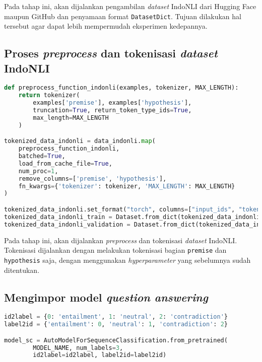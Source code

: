 Pada tahap ini, akan dijalankan pengambilan \emph{dataset} IndoNLI dari Hugging Face maupun GitHub dan penyamaan format \texttt{DatasetDict}. Tujuan dilakukan hal tersebut agar dapat lebih mempermudah eksperimen kedepannya.

\subsection{Proses \emph{preprocess} dan tokenisasi \emph{dataset} IndoNLI}
\begin{lstlisting}[language=Python, caption=Proses \emph{preprocess} dan tokenisasi \emph{dataset} IndoNLI]
def preprocess_function_indonli(examples, tokenizer, MAX_LENGTH):
    return tokenizer(
        examples['premise'], examples['hypothesis'],
        truncation=True, return_token_type_ids=True,
        max_length=MAX_LENGTH
    )

tokenized_data_indonli = data_indonli.map(
    preprocess_function_indonli,
    batched=True,
    load_from_cache_file=True,
    num_proc=1,
    remove_columns=['premise', 'hypothesis'],
    fn_kwargs={'tokenizer': tokenizer, 'MAX_LENGTH': MAX_LENGTH}
)

tokenized_data_indonli.set_format("torch", columns=["input_ids", "token_type_ids"], output_all_columns=True, device=device)
tokenized_data_indonli_train = Dataset.from_dict(tokenized_data_indonli["train"][:SAMPLE])
tokenized_data_indonli_validation = Dataset.from_dict(tokenized_data_indonli["validation"][:SAMPLE])
\end{lstlisting}

Pada tahap ini, akan dijalankan  \emph{preprocess} dan tokenisasi \emph{dataset} IndoNLI. Tokenisasi dijalankan dengan melakukan tokenisasi bagian \texttt{premise} dan \texttt{hypothesis} saja, dengan menggunakan \emph{hyperparameter} yang sebelumnya sudah ditentukan.

\subsection{Mengimpor model \emph{question answering}}
\begin{lstlisting}[language=Python, caption=Mengimpor model \emph{question answering}]
id2label = {0: 'entailment', 1: 'neutral', 2: 'contradiction'}
label2id = {'entailment': 0, 'neutral': 1, 'contradiction': 2}

model_sc = AutoModelForSequenceClassification.from_pretrained(
        MODEL_NAME, num_labels=3, 
        id2label=id2label, label2id=label2id)
\end{lstlisting}

